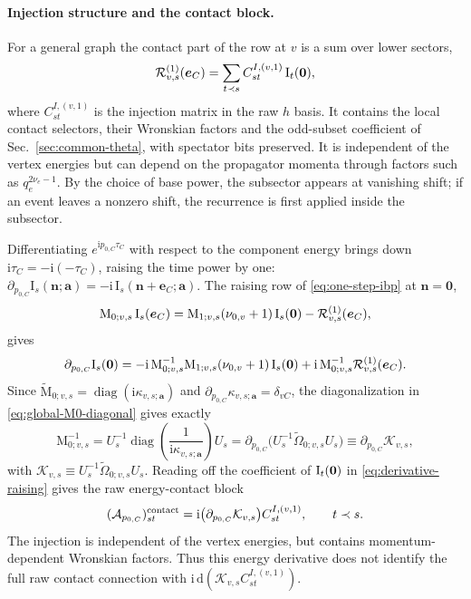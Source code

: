\documentclass[11pt,a4paper]{article}
\numberwithin{table}{section}
\newcommand{\nd}{\mathrm{d}}
\newcommand{\ii}{\mathrm i}
\newcommand{\diag}{\operatorname{diag}}
\newcommand{\cR}{\mathcal R}
\begin{document}
\paragraph{Injection structure and the contact block.}
For a general graph the contact part of the row at $v$ is a sum over lower sectors,
\begin{equation}
  \cR^{(1)}_{v,s}(\bm e_C)=\sum_{t\prec s}C^{I,(v,1)}_{st}\,\bm{\text I}_t(\bm 0),
  \label{eq:contact-injection}
\end{equation}
where $C^{I,(v,1)}_{st}$ is the injection matrix in the raw $h$ basis. It contains the
local contact selectors, their Wronskian factors and the odd-subset coefficient of
Sec.~\ref{sec:common-theta}, with spectator bits preserved. It is independent of the
vertex energies but can depend on the propagator momenta through factors such as
$q_e^{2\nu_e-1}$. By the choice of base power, the subsector appears at vanishing shift;
if an event leaves a nonzero shift, the recurrence is first applied inside the subsector.

Differentiating $e^{\ii p_{0,C}\tau_C}$ with respect to the component energy brings down
$\ii\tau_C=-\ii(-\tau_C)$, raising the time power by one:
$\partial_{p_{0,C}}\text{I}_s(\bm n;\bm a)=-\ii\,\text{I}_s(\bm n+\bm e_C;\bm a)$.
The raising row of \eqref{eq:one-step-ibp} at $\bm n=\bm 0$,
\begin{equation}
  \text{M}_{0;v,s}\,\bm{\text I}_s(\bm e_C)
  =\text{M}_{1;v,s}(\nu_{0,v}+1)\,\bm{\text I}_s(\bm 0)-\cR^{(1)}_{v,s}(\bm e_C),
  \label{eq:raising-row}
\end{equation}
gives
\begin{equation}
  \partial_{p_{0,C}}\bm{\text I}_s(\bm 0)
  =-\ii\,\text{M}_{0;v,s}^{-1}\text{M}_{1;v,s}(\nu_{0,v}+1)\,\bm{\text I}_s(\bm 0)
  +\ii\,\text{M}_{0;v,s}^{-1}\cR^{(1)}_{v,s}(\bm e_C).
  \label{eq:derivative-raising}
\end{equation}
Since $\widetilde{\text{M}}_{0;v,s}=\diag(\ii\kappa_{v,s;\bm a})$ and
$\partial_{p_{0,C}}\kappa_{v,s;\bm a}=\delta_{vC}$, the diagonalization in
\eqref{eq:global-M0-diagonal} gives exactly
\begin{equation}
  \text{M}_{0;v,s}^{-1}
  =U_s^{-1}\diag\!\left(\frac{1}{\ii\kappa_{v,s;\bm a}}\right)U_s
  =\partial_{p_{0,C}}\big(U_s^{-1}\widetilde\Omega_{0;v,s}U_s\big)
  \equiv \partial_{p_{0,C}}\mathcal K_{v,s},
  \label{eq:M0-inverse-derivative}
\end{equation}
with $\mathcal K_{v,s}\equiv U_s^{-1}\widetilde\Omega_{0;v,s}U_s$. Reading off the
coefficient of $\bm{\text I}_t(\bm 0)$ in \eqref{eq:derivative-raising} gives the raw
energy-contact block
\begin{equation}
  (\mathcal A_{p_{0,C}})^{\rm contact}_{st}
  =\ii\bigl(\partial_{p_{0,C}}\mathcal K_{v,s}\bigr)C^{I,(v,1)}_{st},
  \qquad t\prec s.
  \label{eq:raw-energy-contact}
\end{equation}
The injection is independent of the vertex energies, but contains momentum-dependent
Wronskian factors. Thus this energy derivative does not identify the full raw contact
connection with $\ii\,\nd(\mathcal K_{v,s}C^{I,(v,1)}_{st})$.
\end{document}

